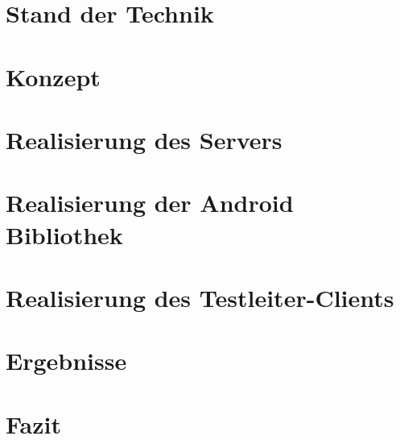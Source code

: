 \documentclass[11pt,a4paper,bibliography=totocnumbered,listof=totocnumbered]{scrartcl}
\begin{document}
\section{Stand der Technik}





\section{Konzept}


\section{Realisierung des Servers\label{sec:realisierung_server}}




\section{Realisierung der Android Bibliothek}

\section{Realisierung des Testleiter-Clients}


\section{Ergebnisse}

\section{Fazit}


\renewcommand\refname{Quellenverzeichnis}
\pagebreak
\singlespacing %
\setlength{\bibitemsep}{12pt} %
\printbibliography
\clearpage
{}
\setcounter{page}{1}
\end{document}
